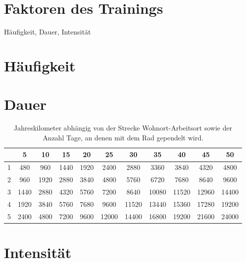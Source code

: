 \section{Faktoren des Trainings}

Häufigkeit, Dauer, Intensität

\section{Häufigkeit}

\section{Dauer}

\begin{table}
        \centering
        \begin{tabular}{ccccccccccc}
                \toprule
&	5	& 10	& 15	& 20	& 25	& 30 & 35	& 40	& 45	& 50\\
    \midrule
1 &	480	& 960	& 1440	& 1920	& 2400	& 2880	& 3360	& 3840	& 4320	& 4800 \\
2 &	960 &	1920 &	2880 &	3840 &	4800 &	5760 &	6720 &	7680 &	8640 &	9600 \\
3 &	1440 & 	2880 &	4320 &	5760 &	7200 &	8640 &	10080 &	11520 &	12960 &	14400 \\
4 &	1920 &	3840 &	5760 &	7680 &	9600 &	11520 &	13440 &	15360 &	17280 &	19200 \\
5 &	2400& 	4800 &	7200 &	9600 &	12000 &	14400 &	16800 &	19200 &	21600 &	24000 \\
\bottomrule
        \end{tabular}
        \caption{Jahreskilometer abhängig von der Strecke Wohnort-Arbeitsort sowie der Anzahl Tage, an denen mit dem Rad gependelt wird.}
        \label{tab:jahreskilometer}
\end{table}

\section{Intensität}



